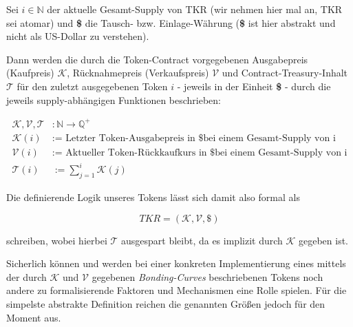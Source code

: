 \begin{Def}
\vspace{0.2cm}

Sei $i \in \mathbb{N}$ der aktuelle Gesamt-Supply von TKR (wir nehmen hier mal an, TKR sei atomar) und \textbf{\$} die Tausch- bzw. Einlage-Währung (\textbf{\$} ist hier abstrakt und nicht als US-Dollar zu verstehen).

Dann werden die durch die Token-Contract vorgegebenen Ausgabepreis (Kaufpreis) $\mathcal{K}$, Rücknahmepreis (Verkaufspreis) $\mathcal{V}$ und Contract-Treasury-Inhalt $\mathbf{\mathcal{T}}$ für den zuletzt ausgegebenen Token $i$ - jeweils in der Einheit \textbf{\$} - durch die jeweils supply-abhängigen Funktionen beschrieben:

\begin{align*}
\mathcal{K}, \mathcal{V}, \mathcal{T} &: \mathbb{N} \rightarrow \mathbb{Q}^{+} \\
\mathcal{K} \left( i \right) &:= \textrm{ Letzter Token-Ausgabepreis in \$ bei einem Gesamt-Supply von i} \\
\mathcal{V} \left( i \right) &:= \textrm{ Aktueller Token-Rückkaufkurs in \$ bei einem Gesamt-Supply von i} \\
\mathcal{T} \left( i \right) &:= \sum_{j = 1}^{i} \mathcal{K} \left( j \right)
\end{align*}

\vspace{0.2cm}

Die definierende Logik unseres Tokens lässt sich damit also formal als 

\begin{equation*}
TKR = \left( \mathcal{K}, \mathcal{V}, \$ \right)
\end{equation*}

schreiben, wobei hierbei $\mathbf{\mathcal{T}}$ ausgespart bleibt, da es implizit durch $\mathbf{\mathcal{K}}$ gegeben ist.

\vspace{0.2cm}

Sicherlich können und werden bei einer konkreten Implementierung eines mittels der durch $\mathbf{\mathcal{K}}$ und $\mathbf{\mathcal{V}}$ gegebenen \textit{Bonding-Curves} beschriebenen Tokens noch andere zu formalisierende Faktoren und Mechanismen eine Rolle spielen. Für die simpelste abstrakte Definition reichen die genannten Größen 
jedoch für den Moment aus.

\end{Def}

\vspace{0.3cm}

